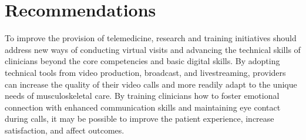 \documentclass[utf8]{FrontiersinHarvard} %
\begin{document}
\section{Recommendations}

To improve the provision of telemedicine, research and training initiatives should address new ways of conducting virtual visits and advancing the technical skills of clinicians beyond the core competencies and basic digital skills. By adopting technical tools from video production, broadcast, and livestreaming, providers can increase the quality of their video calls and more readily adapt to the unique needs of musculoskeletal care. By training clinicians how to foster emotional connection with enhanced communication skills and maintaining eye contact during calls, it may be possible to improve the patient experience, increase satisfaction, and affect outcomes.



% 



\end{document}
